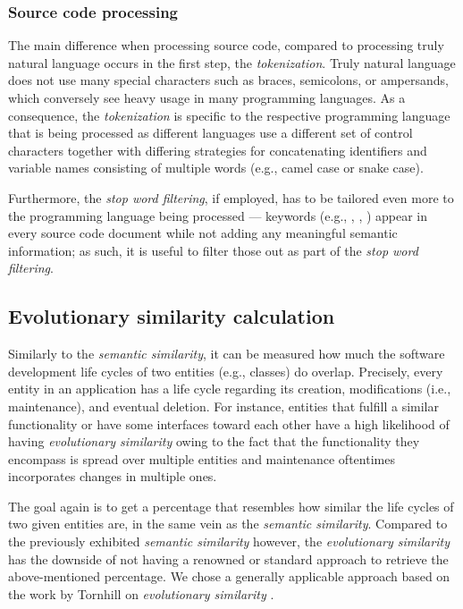 \documentclass[12pt,a4paper]{report}
\begin{document}
\subsubsection{Source code processing}
The main difference when processing source code, compared to processing
truly natural language occurs in the first step, the \textit{tokenization}.
Truly natural language does not use many special characters such as braces,
semicolons, or ampersands, which conversely see heavy usage in
many programming languages.
As a consequence, the \textit{tokenization} is specific to the respective
programming language that is being processed as different languages use a
different set of control characters together with differing strategies for
concatenating identifiers and variable names consisting of multiple words
(e.g., camel case or snake case).

Furthermore, the \textit{stop word filtering}, if employed, has to be tailored
even more to the programming language being processed --- keywords (e.g.,
, , ) appear in every source code document
while not adding any meaningful semantic information; as such, it is useful to
filter those out as part of the \textit{stop word filtering}.


\subsection{Evolutionary similarity calculation} \label{subsect:evolutionary-similarity}

Similarly to the \textit{semantic similarity}, it can be measured how much the
software development life cycles of two entities (e.g., classes) do overlap.
Precisely, every entity in an application has a life cycle regarding its
creation, modifications (i.e., maintenance), and eventual deletion. For
instance, entities that fulfill a similar functionality or have some interfaces
toward each other have a high likelihood of having \textit{evolutionary
similarity} owing to the fact that the functionality they encompass is spread
over multiple entities and maintenance oftentimes incorporates changes in
multiple ones.

The goal again is to get a percentage that resembles how similar the life
cycles of two given entities are, in the same vein as the \textit{semantic
similarity}. Compared to the previously exhibited \textit{semantic similarity}
however, the \textit{evolutionary similarity} has the downside of not having a
renowned or standard approach to retrieve the above-mentioned percentage. We
chose a generally applicable approach based on the work by Tornhill on
\textit{evolutionary similarity} \cite{tornhill2015crimescene}.
\end{document}
